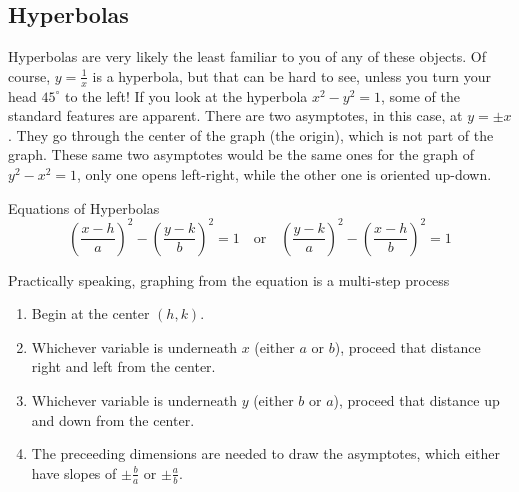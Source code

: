 \subsection{Hyperbolas}
Hyperbolas are very likely the least familiar to you of any of these objects.  Of course, 
$y=\frac{1}{x}$ is a hyperbola, but that can be hard to see, unless you turn your head
$45^\circ$ to the left!  If you look at the hyperbola $x^2-y^2=1$, some of the standard 
features are apparent.  There are two asymptotes, in this case, at $y=\pm x$.  They 
go through the center of the graph (the origin), which is not part of the graph.  These
same two asymptotes would be the same ones for the graph of $y^2-x^2=1$, only
one opens left-right, while the other one is oriented up-down.

\begin{derivation}{Equations of Hyperbolas}
\begin{equation}
\left(\frac{x-h}{a}\right)^2 - \left(\frac{y-k}{b}\right)^2 = 1
\quad \text{or} \quad
\left(\frac{y-k}{a}\right)^2 - \left(\frac{x-h}{b}\right)^2 = 1
\end{equation}
\end{derivation}

Practically speaking, graphing from the equation is a multi-step process
\begin{enumerate}
\item Begin at the center $(h,k)$.
\item Whichever variable is underneath $x$ (either $a$ or $b$), proceed that distance right and left from the center.
\item Whichever variable is underneath $y$ (either $b$ or $a$), proceed that distance up and down from the center.  
\item The preceeding dimensions are needed to draw the asymptotes, which either have slopes of $\pm\frac{b}{a}$ or $\pm\frac{a}{b}$.
\end{enumerate}

